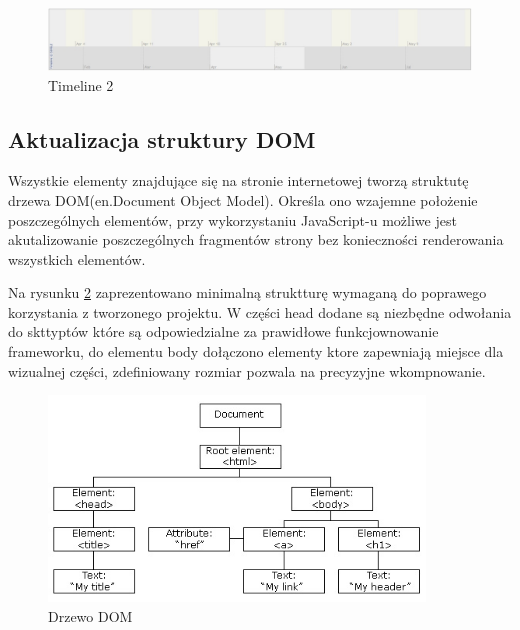   \begin{figure}[H]
  \centering
    \includegraphics[width=150mm]{ge/tm2.jpg}
  \caption{Timeline 2}
  \label{fig:tm2}
\end{figure}

\subsection{Aktualizacja struktury DOM}
\label{subsec:dom}

Wszystkie elementy znajdujące się na stronie internetowej tworzą struktutę drzewa DOM(en.Document Object Model). Określa ono wzajemne położenie poszczególnych elementów, przy wykorzystaniu JavaScript-u możliwe jest akutalizowanie poszczególnych fragmentów strony bez konieczności renderowania wszystkich elementów.

Na rysunku \ref{fig:domtree} zaprezentowano minimalną struktturę wymaganą do poprawego korzystania z tworzonego projektu. W części head dodane są niezbędne odwołania do skttyptów które są odpowiedzialne za prawidłowe funkcjownowanie frameworku, do elementu body dołączono elementy ktore zapewniają miejsce dla wizualnej części, zdefiniowany rozmiar pozwala na precyzyjne wkompnowanie.

\begin{figure}[H]
  \centering
    \includegraphics[width=100mm]{ge/htmltree2.jpg}
  \caption{Drzewo DOM}
  \label{fig:domtree}
\end{figure}
